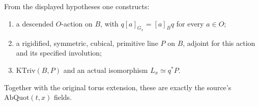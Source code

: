 \begin{srproposition}
\label{prop:faithful-actual-abelian-quotient}
From the displayed hypotheses one constructs:
\begin{enumerate}
\item a descended \(O\)-action on \(B\), with
\(q[a]_{G_x}=[a]_Bq\) for every \(a\in O\);
\item a rigidified, symmetric, cubical, primitive line \(P\)
on \(B\), adjoint for this action and its specified involution;
\item \(\mathrm{KTriv}(B,P)\) and an actual isomorphism
\(L_x\simeq q^*P\).
\end{enumerate}
Together with the original torus extension, these are exactly
the source's \(\mathrm{AbQuot}(t,x)\) fields.
\end{srproposition}
